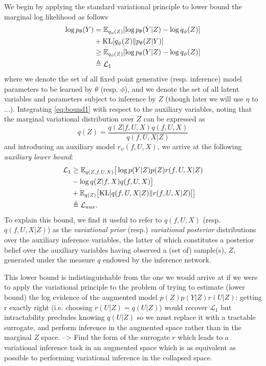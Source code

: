 \documentclass[]{article}
\newcommand{\Ex}{\mathbb{E}}
\newcommand{\KL}{\textrm{KL}}
\newcommand{\f}{f}
\begin{document}
We begin by applying the standard variational principle to lower bound the marginal log likelihood as follows
%
\begin{align}
\log p_\theta(Y) &= \Ex_{q_\phi(Z)}[\log p_\theta(Y|Z) - \log q_\phi(Z)]\notag\\
&+ \text{KL}[q_\phi(Z)\Vert p_\theta(Z|Y)]\label{eq:var_principle}\\
&\geq \Ex_{q_\phi(Z)}[\log p_\theta(Y|Z) - \log q_\phi(Z)] \notag \\
&\triangleq \mathcal{L}_1 \label{eq:bound1}
\end{align}
%
where we denote the set of all fixed point generative (resp. inference) model parameters to be learned by $\theta$ (resp. $\phi$), and we denote the set of all latent variables and parameters subject to inference by $Z$ (though later we will use $\eta$ to ...).
Integrating \ref{eq:bound1} with respect to the auxiliary variables, noting that the marginal variational distribution over $Z$ can be expressed as
\begin{equation}
q(Z) = \frac{q(Z|\f,U,X)q(\f,U,X)}{q(\f,U,X|Z)}
\end{equation}
%
and introducing an auxiliary model $r_\psi(\f,U,X)$, we arrive at the following \emph{auxiliary lower bound}:
%
\begin{align}
\mathcal{L}_1 &\geq \Ex_{q(Z,\f,U,X)}\big[ \log p(Y|Z)p(Z)r(\f,U,X|Z) \notag \\
&- \log q(Z|\f,X)q(\f,U,X) \big] \notag \\
&+ \Ex_{q(Z)}\big[\KL[q(\f,U,X|Z)\Vert r(\f,U,X|Z)]\big] \label{eq:lowerlower} \\
&\triangleq \mathcal{L}_{aux}. \label{eq:L_aux}
\end{align}
%
To explain this bound, we find it useful to refer to $q(\f,U,X)$ (resp. $q(\f,U,X|Z)$) as the \emph{variational prior} (resp.) \emph{variational posterior} distributions over the auxiliary inference variables, the latter of which constitutes a posterior belief over the auxiliary variables having observed a (set of) sample(s), $Z$, generated under the measure $q$ endowed by the inference network.

This lower bound is indistinguishable from the one we would arrive at if we were to apply the variational principle to the problem of trying to estimate (lower bound) the log evidence of the augmented model $p(Z)p(Y|Z)r(U|Z)$: getting r exactly right (i.e. choosing $r(U|Z)=q(U|Z)$) would recover $\mathcal{L}_1$ but intractability precludes knowing $q(U|Z)$ so we must replace it with a tractable surrogate, and perform inference in the augmented space rather than in the marginal $Z$ space.
--> Find the form of the surrogate $r$ which leads to a variational inference task in an augmented space which is as equivalent as possible to performing variational inference in the collapsed space.
\end{document}
